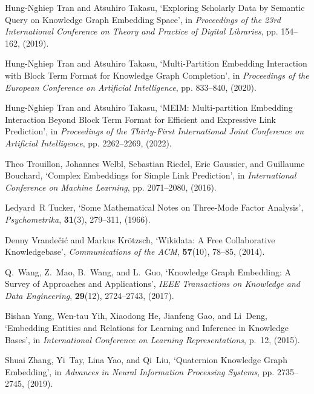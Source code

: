 \documentclass{ecai}
\theoremstyle{plain}  \newtheorem{thm}{Theorem}  \newtheorem{lem}[thm]{Lemma}  \newtheorem{prop}[thm]{Proposition}
\theoremstyle{remark}  \newtheorem*{rem}{Remark}
\begin{document}
\begin{thebibliography}{10}
Hung-Nghiep Tran and Atsuhiro Takasu, `Exploring {{Scholarly Data}} by
  {{Semantic Query}} on {{Knowledge Graph Embedding Space}}', in {\em
  Proceedings of the 23rd {{International Conference}} on {{Theory}} and
  {{Practice}} of {{Digital Libraries}}}, pp. 154--162, (2019).

Hung-Nghiep Tran and Atsuhiro Takasu, `Multi-{{Partition Embedding
  Interaction}} with {{Block Term Format}} for {{Knowledge Graph Completion}}',
  in {\em Proceedings of the {{European Conference}} on {{Artificial
  Intelligence}}}, pp. 833--840, (2020).

Hung-Nghiep Tran and Atsuhiro Takasu, `{{MEIM}}: {{Multi-partition Embedding
  Interaction Beyond Block Term Format}} for {{Efficient}} and {{Expressive
  Link Prediction}}', in {\em Proceedings of the {{Thirty-First International
  Joint Conference}} on {{Artificial Intelligence}}}, pp. 2262--2269, (2022).

Theo Trouillon, Johannes Welbl, Sebastian Riedel, {Eric Gaussier}, and
  {Guillaume Bouchard}, `Complex {{Embeddings}} for {{Simple Link
  Prediction}}', in {\em International {{Conference}} on {{Machine Learning}}},
  pp. 2071--2080, (2016).

Ledyard~R Tucker, `Some {{Mathematical Notes}} on {{Three-Mode Factor
  Analysis}}', {\em Psychometrika}, {\bf 31}(3),  279--311, (1966).

Denny Vrande{\v c}i{\'c} and Markus Kr{\"o}tzsch, `Wikidata: A {{Free
  Collaborative Knowledgebase}}', {\em Communications of the ACM}, {\bf
  57}(10),  78--85, (2014).

Q.~Wang, Z.~Mao, B.~Wang, and L.~Guo, `Knowledge {{Graph Embedding}}: {{A
  Survey}} of {{Approaches}} and {{Applications}}', {\em IEEE Transactions on
  Knowledge and Data Engineering}, {\bf 29}(12),  2724--2743, (2017).

Bishan Yang, Wen-tau Yih, Xiaodong He, Jianfeng Gao, and Li~Deng, `Embedding
  {{Entities}} and {{Relations}} for {{Learning}} and {{Inference}} in
  {{Knowledge Bases}}', in {\em International {{Conference}} on {{Learning
  Representations}}}, p.~12, (2015).

Shuai Zhang, Yi~Tay, Lina Yao, and Qi~Liu, `Quaternion {{Knowledge Graph
  Embedding}}', in {\em Advances in {{Neural Information Processing Systems}}},
  pp. 2735--2745, (2019).

\end{thebibliography}
 
\end{document}
